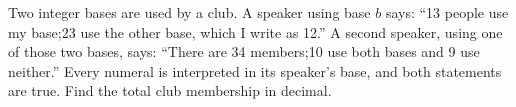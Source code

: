 Two integer bases are used by a club. A speaker using base $b$ says: ``13 people use my base;23 use the other base, which I write as 12.'' A second speaker, using one of those two bases, says: ``There are 34 members;10 use both bases and 9 use neither.'' Every numeral is interpreted in its speaker's base, and both statements are true. Find the total club membership in decimal.
